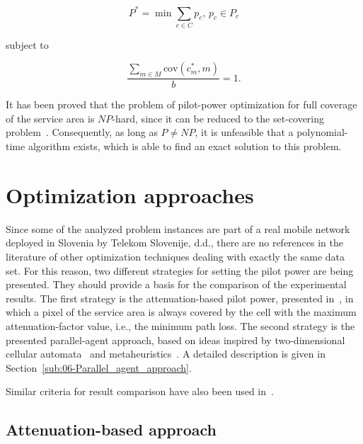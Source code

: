 \begin{equation}
P^{*}=\min\sum_{c\in C}p_{c},\, p_{c}\in P_{c}\label{eq:06-Objective_function}
\end{equation}


\noindent subject to

\begin{equation}
\frac{\sum_{m\in M}\mathrm{cov}(c_{m}^{*},m)}{b}=1.\label{eq:06-Coverage_constraint}
\end{equation}


\bigskip{}


It has been proved that the problem of pilot-power optimization for
full coverage of the service area is $NP$-hard, since it can be reduced
to the set-covering problem~\cite{Varbrand_Mathematical.programming.approach:2003}.
Consequently, as long as $P\neq NP$, it is unfeasible that a polynomial-time
algorithm exists, which is able to find an exact solution to this
problem.


\section{Optimization approaches \label{sec:06-Optimization-approaches}}

Since some of the analyzed problem instances are part of a real mobile
network deployed in Slovenia by Telekom Slovenije, d.d., there are
no references in the literature of other optimization techniques dealing
with exactly the same data set. For this reason, two different strategies
for setting the pilot power are being presented. They should provide
a basis for the comparison of the experimental results. The first
strategy is the attenuation-based pilot power, presented in~\cite{Siomina_Pilot.power.optimization:2004},
in which a pixel of the service area is always covered by the cell
with the maximum attenuation-factor value, i.e., the minimum path
loss. The second strategy is the presented parallel-agent approach,
based on ideas inspired by two-dimensional cellular automata~\cite{Sarkar_Cellular.automata.history:2000}
and metaheuristics~\cite{Talbi_Metaheuristics:2009}. A detailed
description is given in Section~\ref{sub:06-Parallel_agent_approach}.

Similar criteria for result comparison have also been used in~\cite{Siomina_Pilot.power.optimization:2004,Siomina:Minimum.pilot.power.for.service.coverage}.


\subsection{Attenuation-based approach}

